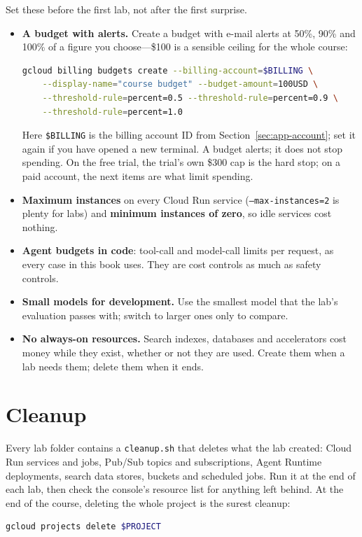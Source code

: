 Set these before the first lab, not after the first surprise.
\begin{itemize}[itemsep=2pt]
  \item \textbf{A budget with alerts.} Create a budget with e-mail alerts at 50\%, 90\% and 100\% of a figure you choose---\$100 is a sensible ceiling for the whole course:
\begin{lstlisting}[language=bash, numbers=none]
gcloud billing budgets create --billing-account=$BILLING \
    --display-name="course budget" --budget-amount=100USD \
    --threshold-rule=percent=0.5 --threshold-rule=percent=0.9 \
    --threshold-rule=percent=1.0
\end{lstlisting}
  Here \texttt{\$BILLING} is the billing account ID from Section~\ref{sec:app-account}; set it again if you have opened a new terminal.
  A budget alerts; it does not stop spending. On the free trial, the trial's own \$300 cap is the hard stop; on a paid account, the next items are what limit spending.
  \item \textbf{Maximum instances} on every Cloud Run service (\texttt{--max-instances=2} is plenty for labs) and \textbf{minimum instances of zero}, so idle services cost nothing.
  \item \textbf{Agent budgets in code}: tool-call and model-call limits per request, as every case in this book uses. They are cost controls as much as safety controls.
  \item \textbf{Small models for development.} Use the smallest model that the lab's evaluation passes with; switch to larger ones only to compare.
  \item \textbf{No always-on resources.} Search indexes, databases and accelerators cost money while they exist, whether or not they are used. Create them when a lab needs them; delete them when it ends.
\end{itemize}

\section{Cleanup}

Every lab folder contains a \texttt{cleanup.sh} that deletes what the lab created: Cloud Run services and jobs, Pub/Sub topics and subscriptions, Agent Runtime deployments, search data stores, buckets and scheduled jobs. Run it at the end of each lab, then check the console's resource list for anything left behind. At the end of the course, deleting the whole project is the surest cleanup:
\begin{lstlisting}[language=bash, numbers=none]
gcloud projects delete $PROJECT
\end{lstlisting}

